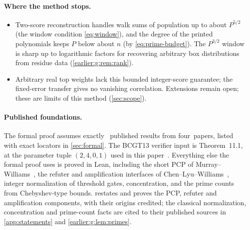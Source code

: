 \documentclass[11pt,letterpaper]{article}
\theoremstyle{definition}
\theoremstyle{remark}
\begin{document}
\paragraph{Where the method stops.}
\begin{itemize}[leftmargin=*,nosep]

\item Two-score reconstruction handles walk sums of population up to about \(P^{5/2}\) (the window condition \eqref{eq:window}), and the degree of the printed polynomials keeps \(P\) below about \(n\) (by \eqref{eq:prime-budget}). The \(P^{3/2}\) window is sharp up to logarithmic factors for recovering arbitrary box distributions from residue data (\cref{earlier:g:rem:rank}).
\item Arbitrary real top weights lack this bounded integer-score guarantee; the fixed-error transfer gives no vanishing correlation. Extensions remain open; these are limits of this method (\cref{sec:scope}).
\end{itemize}

\paragraph{Published foundations.}\label{par:five-inputs}
The formal proof assumes exactly \publishedinputcount\ published results from
 four\ papers, listed with exact locators in \cref{sec:formal}.
The BCGT13 verifier input is Theorem~11.1, at the parameter tuple \((2,4,0,1)\) used in this paper~\cite{BCGT13}.
Everything else the formal proof uses is proved in Lean, including the short PCP of Murray--Williams~\cite{MW20}, the refuter and amplification interfaces of Chen--Lyu--Williams~\cite{CLW20}, integer normalization of threshold gates, concentration, and the prime counts from Chebyshev-type bounds.
 restates and proves the PCP, refuter and amplification components, with their origins credited; the classical normalization, concentration and prime-count facts are cited to their published sources in \cref{app:statements} and \cref{earlier:g:lem:primes}.
\end{document}
